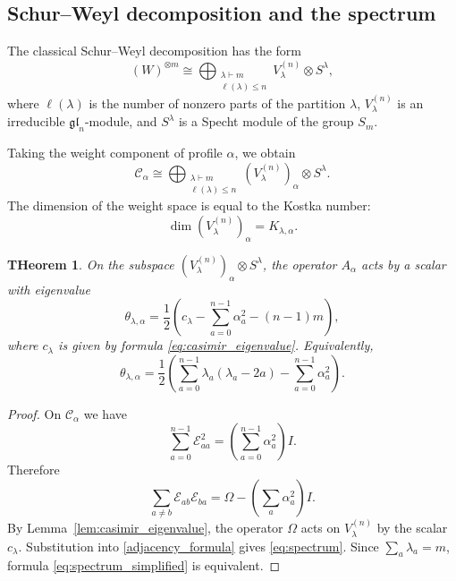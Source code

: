 \documentclass[12pt,reqno]{amsart}
\newtheorem{theorem}{THeorem}[section]
\begin{document}
\subsection{Schur--Weyl decomposition and the spectrum}

The classical Schur--Weyl decomposition has the form
\begin{equation}
(W)^{\otimes m}
\cong
\bigoplus_{\substack{\lambda\vdash m\\\ell(\lambda)\le n}}
V_\lambda^{(n)}\otimes S^\lambda,
\end{equation}
where $\ell(\lambda)$ is the number of nonzero parts of the partition
$\lambda$, $V_\lambda^{(n)}$ is an irreducible $\mathfrak{gl}_n$-module,
and $S^\lambda$ is a Specht module of the group $S_m$.

Taking the weight component of profile $\alpha$, we obtain
\begin{equation}\label{weight_schur_weyl}
\mathcal C_\alpha
\cong
\bigoplus_{\substack{\lambda\vdash m\\\ell(\lambda)\le n}}
(V_\lambda^{(n)})_\alpha\otimes S^\lambda.
\end{equation}
The dimension of the weight space is equal to the Kostka number:
$$
\dim(V_\lambda^{(n)})_\alpha=K_{\lambda,\alpha}.
$$

\begin{theorem}\label{spectrum}
On the subspace
$(V_\lambda^{(n)})_\alpha\otimes S^\lambda$, the operator $A_\alpha$ acts
by a scalar with eigenvalue
\begin{equation}\label{eq:spectrum}
\theta_{\lambda,\alpha}
=
\frac12
\left(
 c_\lambda-
 \sum_{a=0}^{n-1}\alpha_a^2-
 (n-1)m
\right),
\end{equation}
where $c_\lambda$ is given by formula
\eqref{eq:casimir_eigenvalue}. Equivalently,
\begin{equation}\label{eq:spectrum_simplified}
\theta_{\lambda,\alpha}
=
\frac12
\left(
\sum_{a=0}^{n-1}\lambda_a(\lambda_a-2a)
-
\sum_{a=0}^{n-1}\alpha_a^2
\right).
\end{equation}
\end{theorem}

\begin{proof}
On $\mathcal C_\alpha$ we have
$$
\sum_{a=0}^{n-1}\mathcal E_{aa}^2
=
\left(\sum_{a=0}^{n-1}\alpha_a^2\right)I.
$$
Therefore
$$
\sum_{a\ne b}\mathcal E_{ab}\mathcal E_{ba}
=
\Omega-
\left(\sum_a\alpha_a^2\right)I.
$$
By Lemma~\ref{lem:casimir_eigenvalue}, the operator $\Omega$ acts on
$V_\lambda^{(n)}$ by the scalar $c_\lambda$. Substitution into
\eqref{adjacency_formula} gives \eqref{eq:spectrum}. Since
$\sum_a\lambda_a=m$, formula \eqref{eq:spectrum_simplified} is
equivalent.
\end{proof}
\end{document}
